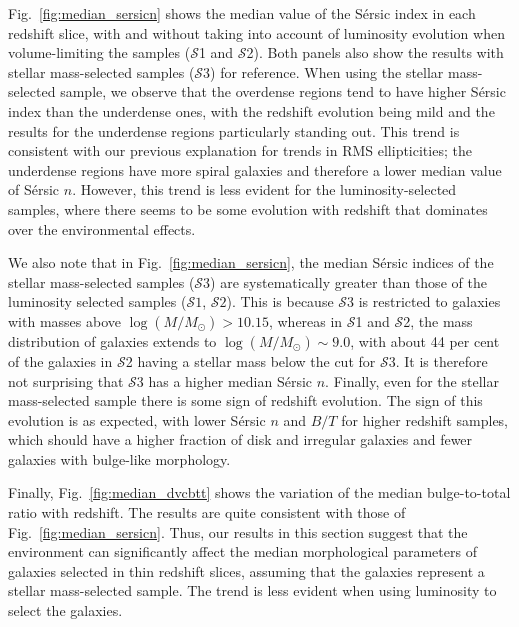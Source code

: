\documentclass[twocolumn,useAMS,usenatbib]{mn2e}
\newcommand{\sersic}{S\'{e}rsic }
\newcommand{\s}{\ensuremath{\mathcal{S}}}
\begin{document}
Fig.~\ref{fig:median_sersicn} shows the median value of the \sersic
index in each redshift slice, with and without taking into account of
luminosity evolution when volume-limiting the samples (\s1 and
\s2). Both panels also show the results with stellar mass-selected
samples (\s3) for reference.  
When using the stellar mass-selected sample, we observe that the
overdense regions tend to have higher \sersic 
index than the underdense ones, with the redshift evolution being mild
and the results for the underdense regions particularly standing
out. This trend is consistent with our previous explanation for trends
in RMS ellipticities; the underdense regions have more spiral galaxies
and therefore a lower median value of \sersic $n$. 
However, this trend is less evident for the luminosity-selected
samples, where there seems to be some evolution with redshift that
dominates over the environmental effects.

We also note that in Fig.~\ref{fig:median_sersicn}, the median \sersic
indices of the stellar mass-selected samples (\s$3$) are
systematically greater than those of the luminosity selected samples
(\s$1$, \s$2$).  
This is because \s3 is restricted to galaxies with masses above $\log(M/M_\odot) > 10.15$, whereas in \s1 and \s2, the mass distribution of galaxies extends to $\log(M/M_\odot) \sim 9.0$,
with about 44 per cent of the galaxies in \s2 having a stellar mass below the cut for \s3.
It is therefore not surprising that \s3 has a higher median \sersic $n$.  Finally, even for
the stellar mass-selected sample there is some sign of redshift
evolution.  The sign of this evolution is as expected, with lower
\sersic $n$ and $B/T$ for higher redshift samples, which should have a
higher fraction of disk and irregular galaxies and fewer galaxies with
bulge-like morphology.
 
Finally, Fig.~\ref{fig:median_dvcbtt} shows the variation of the median
bulge-to-total ratio with redshift. The results are quite consistent
with those of Fig.~\ref{fig:median_sersicn}. 
Thus, our results in this section suggest that the 
environment can significantly affect the median morphological
parameters of galaxies selected in thin redshift
slices, assuming that the galaxies represent a stellar mass-selected
sample.  The trend is less evident when using luminosity to select the
galaxies.
\end{document}

